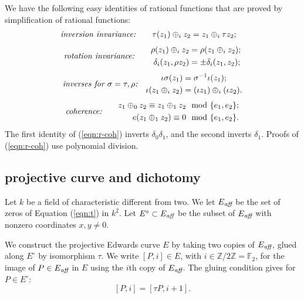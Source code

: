 \documentclass{llncs}
\newcommand{\ring}[1]{\mathbb{#1}}
\newcommand{\op}[1]{\hbox{#1}}
\newcommand{\Eaff}{E_{\op{\scriptsize\it aff}}}
\newcommand{\Eoo}{E^{\circ}} %
\begin{document}
We have the following easy identities of rational functions that are
proved by simplification of rational functions:
\begin{align}\label{eqn:r-tau}
\text{\it inversion invariance:}\quad\quad
\tau (z_1)\oplus_i z_2 &= z_1 \oplus_i \tau z_2;
\end{align}
\begin{align}\label{eqn:r-rho}
\text{\it rotation invariance:}\quad\quad
\begin{split}
\rho(z_1)\oplus_i z_2 &= \rho(z_1\oplus_i z_2);\\
\delta_i(z_1,\rho z_2) &= \pm \delta_i(z_1,z_2);
\end{split}
\end{align}
\begin{align}\label{eqn:r-iota}%
\text{\it inverses for $\sigma=\tau,\rho$:}\quad
\begin{split}
\iota \sigma(z_1) &= \sigma^{-1} \iota (z_1);\\
\iota (z_1\oplus_i z_2) &= (\iota z_1)\oplus_i (\iota z_2).
\end{split}
\end{align}
%
\begin{align}\label{eqn:r-coh}
  \text{\it coherence:}\quad\quad
\begin{split}
z_1 \oplus_0 z_2 \equiv z_1 \oplus_1 z_2 &\mod \{e_1,e_2\};\\
e(z_1\oplus_1 z_2) \equiv 0 &\mod \{e_1,e_2\}.
\end{split}
\end{align}
The first identity of (\ref{eqn:r-coh}) inverts $\delta_0\delta_1$,
and the second inverts $\delta_1$. Proofs of (\ref{eqn:r-coh}) use
polynomial division.

\subsection{projective curve and dichotomy}\label{sec:dichot}

Let $k$ be a field of characteristic different from two.  We let
$\Eaff$ be the set of zeros of Equation (\ref{eqn:t}) in $k^2$.  Let
$\Eoo\subset \Eaff$ be the subset of $\Eaff$ with nonzero coordinates
$x,y\ne0$.

We construct the projective Edwards curve $E$ by taking two copies of
$\Eaff$, glued along $\Eoo$ by isomorphism $\tau$.  We write $[P,i]\in
E$, with $i\in \ring{Z}/2\ring{Z}=\ring{F}_2$, for the image of $P\in
\Eaff$ in $E$ using the $i$th copy of $\Eaff$.  The gluing condition
gives for $P\in \Eoo$:
\begin{equation}\label{eqn:glue}
[P,i]=[\tau P,i+1].
\end{equation}
\end{document}
